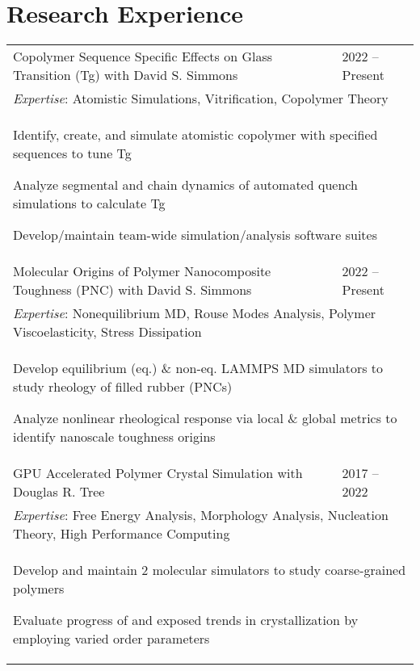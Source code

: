 \documentclass[letterpaper,11pt]{article}
\begin{document}
\section*{Research Experience}
\vspace{+0.1cm}
\bgroup
\setlength\extrarowheight{-12pt}
\def\arraystretch{0.5}
\begin{tabular}{@{}p{}l@{}}
  Copolymer Sequence Specific Effects on Glass Transition (Tg) with David S. Simmons & 2022 -- Present \\
  \multicolumn{2}{p{\textwidth}}{\textit{Expertise}: Atomistic Simulations, Vitrification, Copolymer Theory} \\
  \multicolumn{2}{p{\textwidth}}{
    \begin{tabitemize} 
      \item Identify, create, and simulate atomistic copolymer with specified sequences to tune Tg
      \item Analyze segmental and chain dynamics of automated quench simulations to calculate Tg
      \item Develop/maintain team-wide simulation/analysis software suites
    \end{tabitemize}
  } \\ 

  Molecular Origins of Polymer Nanocomposite Toughness (PNC) with David S. Simmons & 2022 -- Present \\
  \multicolumn{2}{p{\textwidth}}{\textit{Expertise}: Nonequilibrium MD, Rouse Modes Analysis, Polymer Viscoelasticity, Stress Dissipation} \\
  \multicolumn{2}{p{\textwidth}}{
    \begin{tabitemize} 
      \item Develop equilibrium (eq.) \& non-eq. LAMMPS MD simulators to study rheology of filled rubber (PNCs)
      \item Analyze nonlinear rheological response via local \& global metrics to identify nanoscale toughness origins
    \end{tabitemize}
  }  \\ 

  GPU Accelerated Polymer Crystal Simulation with Douglas R. Tree & 2017 -- 2022 \\
  \multicolumn{2}{p{\textwidth}}{\textit{Expertise}: Free Energy Analysis, Morphology Analysis, Nucleation Theory, High Performance Computing} \\
  \multicolumn{2}{p{\textwidth}}{
    \begin{tabitemize} 
      \item Develop and maintain 2 molecular simulators to study coarse-grained polymers
      \item Evaluate progress of and exposed trends in crystallization by employing varied order parameters
    \end{tabitemize}
  }  \\ 


\end{tabular}
\end{document}
